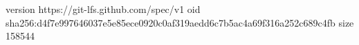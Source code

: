 version https://git-lfs.github.com/spec/v1
oid sha256:d4f7e997646037e5e85ece0920c0af319aedd6c7b5ac4a69f316a252c689c4fb
size 158544
